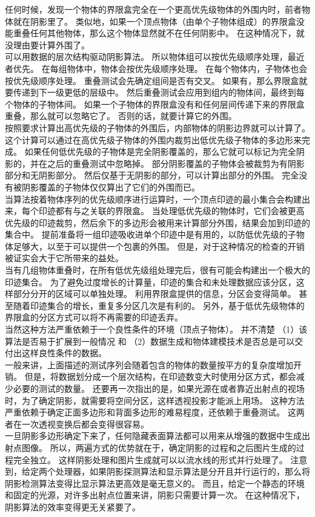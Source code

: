 任何时候，发现一个物体的界限盒完全在一个更高优先级物体的外围内时，前者物体就在阴影里了。
类似地，如果一个顶点物体（由单个子物体组成）的界限盒没能重叠任何其他物体，那么这个物体显然就不在任何阴影中。
在这种情况下，就没理由要计算外围了。\\
可以用数据的层次结构驱动阴影算法。
所以物体组可以按优先级顺序处理，最近者优先。
在每组物体中，物体会按优先级顺序处理。
在每个物体内，子物体也会按优先级顺序处理。
重叠测试会先确定组间是否有交叉。
如果有，那么界限盒就要传递到下一级更低的层级中。
然后重叠测试会应用到组内的物体间，最终到每个物体的子物体间。
如果一个子物体的界限盒没有和任何层间传递下来的界限盒重叠，那么就可以忽略它了。
否则的话，就要计算它的外围。\\
按照要求计算出高优先级的子物体的外围后，内部物体的阴影边界就可以计算了。
这个计算可以通过在高优先级子物体的外围内裁剪出低优先级子物体的多边形来完成。
如果任何低优先级的子物体是完全阴影覆盖的，那么它就可以标记为完全阴影的，并在之后的重叠测试中忽略掉。
部分阴影覆盖的子物体会被裁剪为有阴影部分和无阴影部分。
然后仅基于无阴影的部分，可以计算出部分的外围。
完全没有被阴影覆盖的子物体仅仅算出了它们的外围而已。\\
当算法按着物体序列的优先级顺序进行运算时，一个顶点印迹的最小集合会构建出来，每个印迹都有与之关联的界限盒。
当处理低优先级的物体时，它们会被更高优先级的印迹裁剪，然后余下的多边形会被用来计算部分外围，结果会加到印迹的集合中。
提前准备将一组印迹吸收进单个印迹中是有用的，以防低优先级的子物体足够大，以至于可以提供一个包裹的外围。
但是，对于这种情况的检查的开销被证实会大于它所带来的益处。\\
当有几组物体重叠时，在所有低优先级组处理完后，很有可能会构建出一个极大的印迹集合。
为了避免过度增长的计算量，印迹的集合和未处理数据应该分区，这样部分分开的区域可以单独处理。
利用界限盒提供的信息，分区会变得简单。
甚至随着印迹集合的增长，重复多分区几次是有利的。
另外，基于低优先级物体的界限盒的分区方式可以将不再需要的印迹丢弃。\\
当然这种方法严重依赖于一个良性条件的环境（顶点子物体）。
并不清楚
（1）该算法是否易于扩展到一般情况 和
（2）数据生成和物体建模技术是否总是可以交付出这样良性条件的数据。\\
一般来讲，上面描述的测试序列会随着包含的物体的数量按平方的复杂度增加开销。
但是，将数据划分成一个层次结构，在印迹数变大时使用分区方式，都会减少必要的测试的数量。
还要再一次指出的是，如果光源在或者靠近出射点的视场时，为了确定阴影，就需要将空间分区，这样透视投影才能派上用场。
这种方法严重依赖于确定正面多边形和背面多边形的难易程度，还依赖于重叠测试。
这两者在一次透视变换后都会变得很容易。\\
一旦阴影多边形确定下来了，任何隐藏表面算法都可以用来从增强的数据中生成出射点图像。
所以，两遍方式的优势就在于，确定阴影的过程和之后图片生成的过程完全独立。
这样阴影处理和图片生成就可以以流水线的形式并行处理了。
注意到，给定两个处理器，如果阴影探测算法和显示算法是分开且并行运行的，那么将阴影检测算法变得比显示算法更高效是毫无意义的。
而且，给定一个静态的环境和固定的光源，对许多出射点位置来讲，阴影只需要计算一次。
在这种情况下，阴影算法的效率变得更无关紧要了。